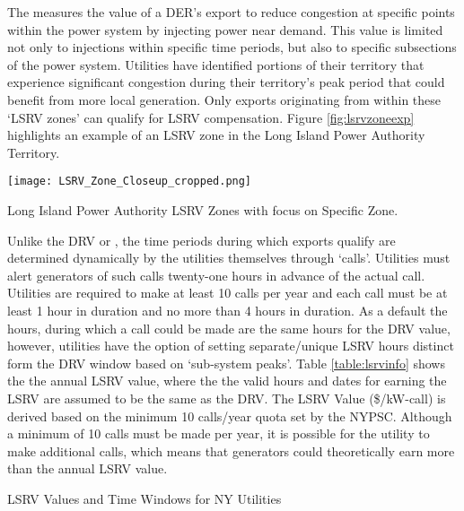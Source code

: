 The \lsrv{} measures the value of a DER's export to reduce congestion at specific points within the power system by injecting power near demand. This value is limited not only to injections within specific time periods, but also to specific subsections of the power system. Utilities have identified portions of their territory that experience significant congestion during their territory's peak period that could benefit from more local generation. Only exports originating from within these `LSRV zones' can qualify for LSRV compensation. Figure \ref{fig:lsrvzoneexp} highlights an example of an LSRV zone in the Long Island Power Authority Territory.

\begin{conditionalfigure}[!htb]
  \centering
	  \texttt{[image: LSRV\_Zone\_Closeup\_cropped.png]}
	  \caption{Long Island Power Authority LSRV Zones with focus on Specific Zone.}
	  \label{fig:lsrvzoneexp}
\end{conditionalfigure}

Unlike the DRV or \aciv{}, the time periods during which exports qualify are determined dynamically by the utilities themselves through `calls'. Utilities must alert generators of such calls twenty-one hours in advance of the actual call. Utilities are required to make at least 10 calls per year and each call must be at least 1 hour in duration and no more than 4 hours in duration. As a default the hours, during which a call could be made are the same hours for the DRV value, however, utilities have the option of setting separate/unique LSRV hours distinct form the DRV window based on `sub-system peaks'.  Table \ref{table:lsrvinfo} shows the the annual LSRV value, where the the valid hours and dates for earning the LSRV are assumed to be the same as the DRV. The LSRV Value (\$/kW-call) is derived based on the minimum 10 calls/year quota set by the NYPSC. Although a minimum of 10 calls must be made per year, it is possible for the utility to make additional calls, which means that generators could theoretically earn more than the annual LSRV value.

\begin{conditionaltable}[!htb]
\centering
    \pgfplotstabletypeset[column type = lcc, multicolumn names,
      col sep=comma,
	display columns/0/.style={string type, column name=Utility},
	display columns/1/.style={string type, column name= Annual Value},
	display columns/2/.style={fixed, fixed zerofill, precision = 3, column name= LSRV Value},
	every head row/.style={
		before row={\toprule}, 
		after row= & \$/kW-year & \$/kW-call\\ 
					\midrule
		},
	every last row/.style={
		after row=\bottomrule
		},
    ]{\lsrvvals}
\caption{LSRV Values and Time Windows for NY Utilities}
\label{table:lsrvinfo}
\end{conditionaltable}


